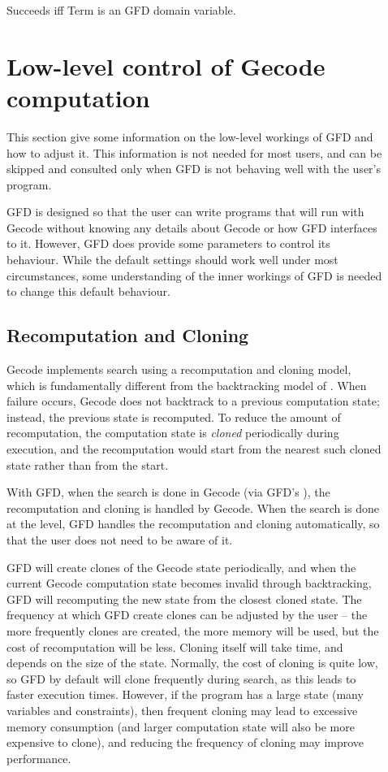 \begin{description}
\item[]
Succeeds iff Term is an GFD domain variable.

\section{Low-level control of Gecode computation}
This section give some information on the low-level workings of GFD and how
to adjust it. This information is not needed for most users, and can be 
skipped and consulted only when GFD is not behaving well with the user's
program.

GFD is designed so that the user can write programs that will run with
 Gecode without knowing any details about Gecode or how GFD interfaces
 to it. However, GFD does provide some parameters to control its behaviour.
While the default settings should work well under most circumstances, some
understanding of the inner workings of GFD is needed to change this default
behaviour. 

\subsection{Recomputation and Cloning}


Gecode implements search using a recomputation and cloning model,
which is fundamentally different from the backtracking model of \eclipse.
When failure occurs, Gecode does not backtrack to a previous computation
state; instead, the previous state is recomputed. To reduce the amount
of recomputation, the computation state is {\it cloned\/} periodically
during execution, and the recomputation would start from the nearest
such cloned state rather than from the start.

With GFD, when the search is done in Gecode (via GFD's 
), the
recomputation and cloning is handled by Gecode. When the search is done
at the \eclipse level, GFD handles the recomputation and cloning automatically,
so that the user does not need to be aware of it.

GFD will create clones of the Gecode state periodically, and when the
current Gecode computation state becomes invalid through \eclipse backtracking,
GFD will recomputing the new state from the closest cloned state. 
The frequency at which GFD create clones can be adjusted by the user --
the more frequently clones are created, the more memory will be used, but
the cost of recomputation will be less. Cloning itself will take time,
and depends on the size of the state. Normally, the cost of cloning is
quite low, so GFD by default will clone frequently during search, as 
this leads to faster execution times. However, if the program has a large
state (many variables and constraints), then frequent cloning may lead to
excessive memory consumption (and larger computation state will also be 
more expensive to clone), and reducing the frequency of cloning may
improve performance.


\end{description}
